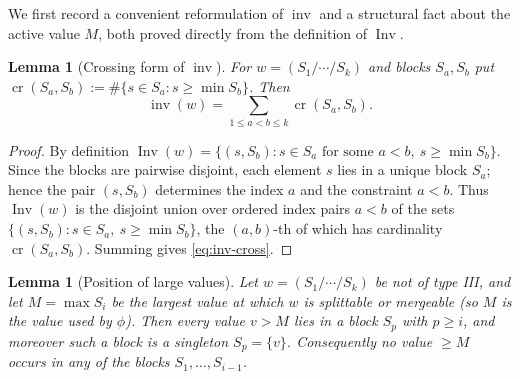 \documentclass[11pt]{amsart}
\newtheorem{lemma}[theorem]{Lemma}
\theoremstyle{definition}
\DeclareMathOperator{\inv}{inv}
\DeclareMathOperator{\Inv}{Inv}
\begin{document}
We first record a convenient reformulation of $\inv$ and a structural fact about
the active value $M$, both proved directly from the definition of $\Inv$.

\begin{lemma}[Crossing form of $\inv$]\label{lem:inv-cross}
For $w=(S_1/\cdots/S_k)$ and blocks $S_a,S_b$ put
$\operatorname{cr}(S_a,S_b):=\#\{s\in S_a: s\ge\min S_b\}$. Then
\begin{equation}\label{eq:inv-cross}
\inv(w)=\sum_{1\le a<b\le k}\operatorname{cr}(S_a,S_b).
\end{equation}
\end{lemma}

\begin{proof}
By definition $\Inv(w)=\{(s,S_b): s\in S_a\text{ for some }a<b,\ s\ge\min S_b\}$.
Since the blocks are pairwise disjoint, each element $s$ lies in a unique block
$S_a$; hence the pair $(s,S_b)$ determines the index $a$ and the constraint $a<b$.
Thus $\Inv(w)$ is the disjoint union over ordered index pairs $a<b$ of the sets
$\{(s,S_b): s\in S_a,\ s\ge\min S_b\}$, the $(a,b)$-th of which has cardinality
$\operatorname{cr}(S_a,S_b)$. Summing gives \eqref{eq:inv-cross}.
\end{proof}

\begin{lemma}[Position of large values]\label{lem:large-values}
Let $w=(S_1/\cdots/S_k)$ be not of type III, and let $M=\max S_i$ be the largest
value at which $w$ is splittable or mergeable (so $M$ is the value used by
$\phi$). Then every value $v>M$ lies in a block $S_p$ with $p\ge i$, and
moreover such a block is a singleton $S_p=\{v\}$. Consequently no value $\ge M$
occurs in any of the blocks $S_1,\dots,S_{i-1}$.
\end{lemma}
\end{document}
